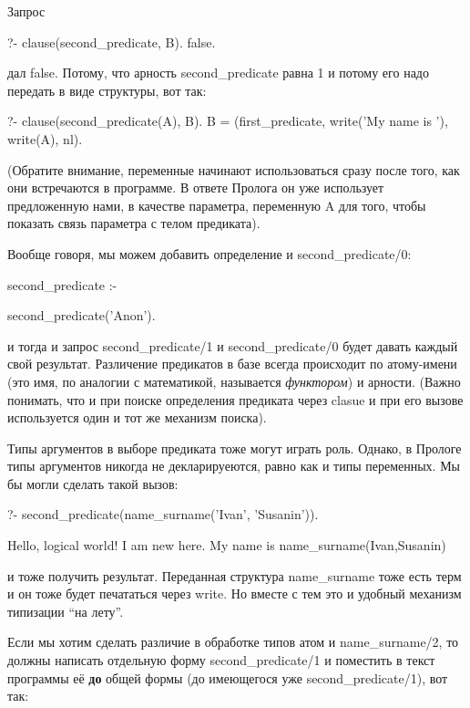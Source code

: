 \documentclass[a4paper]{book}
\begin{document}
Запрос  

\begin{example}{}{}
?- clause(second_predicate, B).
false.
\end{example}

дал false. Потому, что арность second_predicate равна 1 и потому
его надо передать в виде структуры, вот так:

\begin{example}{}{}
?- clause(second_predicate(A), B).                        
B = (first_predicate, write('My name is '), write(A),
 nl).                                                    
\end{example}

(Обратите внимание, переменные начинают использоваться сразу
после того, как они встречаются в программе. В ответе Пролога он
уже использует предложенную нами, в качестве параметра,
переменную A для того, чтобы показать связь параметра с телом
предиката).

Вообще говоря, мы можем добавить определение и
second_predicate/0:

\begin{example}{}{}
second_predicate :-

   second_predicate('Anon').
\end{example}

и тогда и запрос second_predicate/1 и second_predicate/0 будет
давать каждый свой результат. Различение предикатов в базе всегда
происходит по атому-имени (это имя, по аналогии с математикой,
называется {\it функтором\/}) и арности. (Важно понимать, что и
при поиске определения предиката через clasue и при его вызове
используется один и тот же механизм поиска).

Типы аргументов в выборе предиката тоже могут играть
роль. Однако, в Прологе типы аргументов никогда не декларируеются,
равно как и типы переменных. Мы бы могли сделать такой вызов:

\begin{example}{}{}
?- second_predicate(name_surname('Ivan', 'Susanin')).

Hello, logical world!
I am new here.
My name is name_surname(Ivan,Susanin)
\end{example}

и тоже получить результат. Переданная структура name_surname тоже
есть терм и он тоже будет печататься через write. Но вместе с тем
это и удобный механизм типизации ``на лету''.

Если мы хотим сделать различие в обработке типов атом и
name_surname/2, то должны написать отдельную форму
second_predicate/1 и поместить в текст программы её {\bf до}
общей формы (до имеющегося уже second_predicate/1), вот так:
\end{document}
